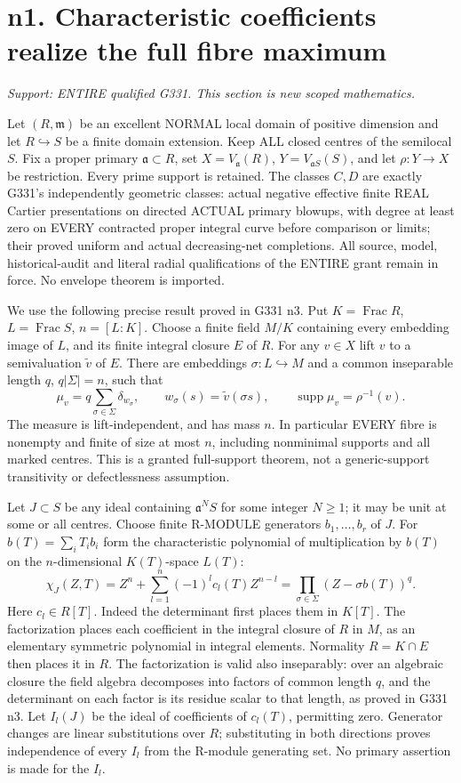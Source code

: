 \section{n1. Characteristic coefficients realize the full fibre maximum}
\textit{Support: ENTIRE qualified G331. This section is new scoped mathematics.}

Let $(R,\mathfrak m)$ be an excellent NORMAL local domain of positive
dimension and let $R\hookrightarrow S$ be a finite domain extension.
Keep ALL closed centres of the semilocal $S$. Fix a proper primary
$\mathfrak a\subset R$, set $X=V_{\mathfrak a}(R)$,
$Y=V_{\mathfrak aS}(S)$, and let $\rho:Y\to X$ be restriction.
Every prime support is retained. The classes $C,D$ are exactly G331's
independently geometric classes: actual negative effective finite REAL
Cartier presentations on directed ACTUAL primary blowups, with degree
at least zero on EVERY contracted proper integral curve before comparison
or limits; their proved uniform and actual decreasing-net completions.
All source, model, historical-audit and literal radial qualifications of
the ENTIRE grant remain in force. No envelope theorem is imported.

We use the following precise result proved in G331 n3. Put
$K=\operatorname{Frac}R$, $L=\operatorname{Frac}S$, $n=[L:K]$.
Choose a finite field $M/K$ containing every embedding image of $L$, and
its finite integral closure $E$ of $R$. For any $v\in X$ lift $v$ to
a semivaluation $\widetilde v$ of $E$. There are embeddings
$\sigma:L\hookrightarrow M$ and a common inseparable length $q$,
$q|\Sigma|=n$, such that
\[
 \mu_v=q\sum_{\sigma\in\Sigma}\delta_{w_\sigma},\qquad
 w_\sigma(s)=\widetilde v(\sigma s),
 \qquad \operatorname{supp}\mu_v=\rho^{-1}(v).
\]
The measure is lift-independent, and has mass $n$. In particular EVERY
fibre is nonempty and finite of size at most $n$, including nonminimal
supports and all marked centres. This is a granted full-support theorem,
not a generic-support transitivity or defectlessness assumption.

Let $J\subset S$ be any ideal containing $\mathfrak a^N S$ for some
integer $N\ge1$; it may be unit at some or all centres. Choose finite
R-MODULE generators $b_1,\ldots,b_r$ of $J$. For
$b(T)=\sum_iT_ib_i$ form the characteristic polynomial of multiplication
by $b(T)$ on the $n$-dimensional $K(T)$-space $L(T)$:
\[
 \chi_J(Z,T)=Z^n+\sum_{l=1}^n(-1)^l c_l(T)Z^{n-l}
           =\prod_{\sigma\in\Sigma}(Z-\sigma b(T))^q.
\]
Here $c_l\in R[T]$. Indeed the determinant first places them in $K[T]$.
The factorization places each coefficient in the integral closure of $R$
in $M$, as an elementary symmetric polynomial in integral elements.
Normality $R=K\cap E$ then places it in $R$. The factorization is valid
also inseparably: over an algebraic closure the field algebra decomposes
into factors of common length $q$, and the determinant on each factor
is its residue scalar to that length, as proved in G331 n3.
Let $I_l(J)$ be the ideal of coefficients of $c_l(T)$, permitting zero.
Generator changes are linear substitutions over $R$; substituting in
both directions proves independence of every $I_l$ from the R-module
generating set. No primary assertion is made for the $I_l$.


